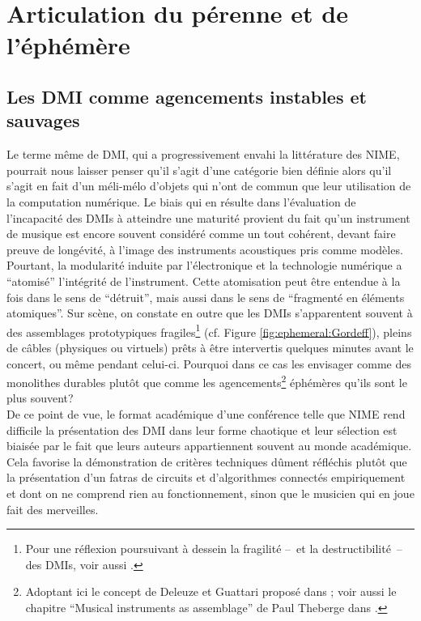 \section{Articulation du pérenne et de l'éphémère}

\subsection{Les DMI comme agencements instables et sauvages}

\noindent Le terme même de \gls{DMI}, qui a progressivement envahi la littérature des \gls{NIME}, pourrait nous laisser penser qu'il s'agit d'une catégorie bien définie alors qu'il s'agit en fait d'un méli-mélo d'objets qui n'ont de commun que leur utilisation de la computation numérique. Le biais qui en résulte dans l'évaluation de l'incapacité des \glspl{DMI} à atteindre une maturité provient du fait qu'un instrument de musique est encore souvent considéré comme un tout cohérent, devant faire preuve de longévité, à l’image des instruments acoustiques pris comme modèles.\\
\indent Pourtant, la modularité induite par l'électronique et la technologie numérique a ``atomisé'' l'intégrité de l'instrument. Cette atomisation peut être entendue à la fois dans le sens de ``détruit'', mais aussi dans le sens de ``fragmenté en éléments atomiques''. Sur scène, on constate en outre que les \glspl{DMI} s'apparentent souvent à des assemblages prototypiques fragiles\footnote{Pour une réflexion poursuivant à dessein la fragilité --~et la destructibilité~-- des \glspl{DMI}, voir aussi \cite{berthaut_wubbles:_2014, haddad_fragile_2017}.} (cf. Figure \ref{fig:ephemeral:Gordeff}), pleins de câbles (physiques ou virtuels) prêts à être intervertis quelques minutes avant le concert, ou même pendant celui-ci. Pourquoi dans ce cas les envisager comme des monolithes durables plutôt que comme les agencements\footnote{Adoptant ici le concept de Deleuze et Guattari proposé dans \cite{deleuze_mille_1980}; voir aussi le chapitre ``Musical instruments as assemblage'' de Paul Theberge dans \cite{bovermann_musical_2017}.} éphémères qu’ils sont le plus souvent?\\
\indent De ce point de vue, le format académique d'une conférence telle que \gls{NIME} rend difficile la présentation des \gls{DMI} dans leur forme chaotique et leur sélection est biaisée par le fait que leurs auteurs appartiennent souvent au monde académique. Cela favorise la démonstration de critères techniques dûment réfléchis plutôt que la présentation d'un fatras de circuits et d'algorithmes connectés empiriquement et dont on ne comprend rien au fonctionnement, sinon que le musicien qui en joue fait des merveilles.\\
